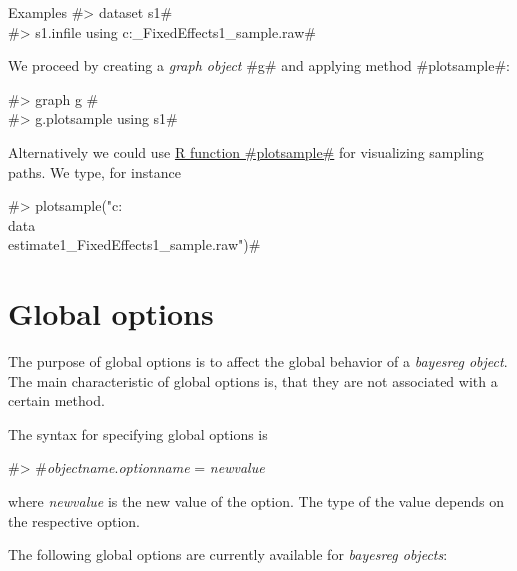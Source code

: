 \begin{stanza}{Examples}
#> dataset s1# \\
#> s1.infile using c:\data{}_FixedEffects1_sample.raw#

We proceed by creating a {\em graph object} #g# and applying
method #plotsample#:

#> graph g #\\
#> g.plotsample using s1#

Alternatively we could use \hyperref[rpackage]{R function #plotsample#} for visualizing sampling paths. We type,
for instance

#> plotsample("c:\\data\\estimate1_FixedEffects1_sample.raw")#

\end{stanza}

\section{Global options}
\label{bayesregglobopt} 

The purpose of global options is to affect the global behavior of
a {\em bayesreg object}. The main characteristic of global options
is, that they are not associated with a certain method.

The syntax for specifying global options is

#> #{\em objectname}.{\em optionname} = {\em newvalue}

where {\em newvalue} is the new value of the option. The type of
the value depends on the respective option.

The following global options are currently available for {\em
bayesreg objects}:


